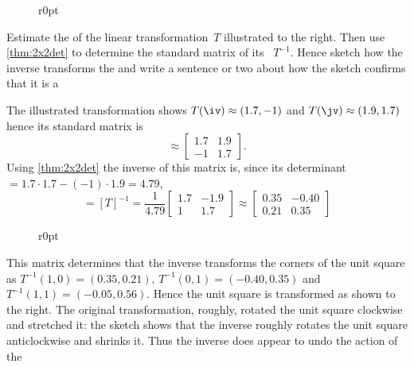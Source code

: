 \begin{wrapfigure}r{0pt} 
\end{wrapfigure}
\begin{example} 
Estimate the  of the linear transformation~\(T\) illustrated to the right.  
Then use \cref{thm:2x2det} to determine the standard matrix of its 
~\(T^{-1}\).
Hence sketch how the inverse transforms the  and write a sentence or two about how the sketch confirms that it is a 
\begin{solution} 
The illustrated transformation shows \(T(\iv)\approx(1.7,-1)\) and \(T(\jv)\approx(1.9,1.7)\) hence its standard matrix is
\begin{equation*}
[T]\approx\begin{bmatrix} 1.7&1.9\\-1&1.7 \end{bmatrix}.
\end{equation*}
Using \cref{thm:2x2det} the inverse of this matrix is, since its determinant\({}=1.7\cdot1.7-(-1)\cdot1.9=4.79\),
\begin{equation*}
[T^{-1}]=[T]^{-1}
=\frac1{4.79} \begin{bmatrix} 1.7&-1.9\\1&1.7 \end{bmatrix}
\approx\begin{bmatrix} 0.35&-0.40\\0.21&0.35 \end{bmatrix}
\end{equation*}

\begin{wrapfigure}r{0pt}
\end{wrapfigure}
This matrix determines that the inverse transforms the corners of the unit square as \(T^{-1}(1,0)=(0.35,0.21)\), \(T^{-1}(0,1)=(-0.40,0.35)\) and \(T^{-1}(1,1)=(-0.05,0.56)\).
Hence the unit square is transformed as shown to the right.
The original transformation, roughly, rotated the unit square clockwise and stretched it: the sketch shows that the inverse roughly rotates the unit square anticlockwise and shrinks it.  
Thus the inverse does appear to undo the action of the 
\end{solution}
\end{example}


